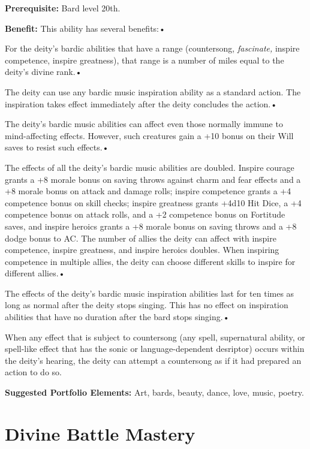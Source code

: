 \documentclass{article}
\begin{document}
\textbf{Prerequisite:} Bard level 20th.

\textbf{Benefit:} This ability has several benefits:• 

\parindent=3pt
For the deity's bardic abilities that have a range (countersong, \textit{fascinate, 
}inspire competence, inspire greatness), that range is a number of miles equal 
to the deity's divine rank.• 

The deity can use any bardic music inspiration ability as a standard action. The 
inspiration takes effect immediately after the deity concludes the action.• 

\parindent=7pt
The deity's bardic music abilities can affect even those normally immune to mind-affecting 
effects. However, such creatures gain a +10 bonus on their Will saves to resist 
such effects.• 

\parindent=3pt
The effects of all the deity's bardic music abilities are doubled. Inspire courage 
grants a +8 morale bonus on saving throws against charm and fear effects and a 
+8 morale bonus on attack and damage rolls; inspire competence grants a +4 competence 
bonus on skill checks; inspire greatness grants +4d10 Hit Dice, a +4 competence 
bonus on attack rolls, and a +2 competence bonus on Fortitude saves, and inspire 
heroics grants a +8 morale bonus on saving throws and a +8 dodge bonus to AC. The 
number of allies the deity can affect with inspire competence, inspire greatness, 
and inspire heroics doubles. When inspiring competence in multiple allies, the 
deity can choose different skills to inspire for different allies.• 

The effects of the deity's bardic music inspiration abilities last for ten times 
as long as normal after the deity stops singing. This has no effect on inspiration 
abilities that have no duration after the bard stops singing.• 

\parindent=7pt
When any effect that is subject to countersong (any spell, supernatural ability, 
or spell-like effect that has the sonic or language-dependent desriptor) occurs 
within the deity's hearing, the deity can attempt a countersong as if it had prepared 
an action to do so.

\parindent=0pt
\textbf{Suggested Portfolio Elements:} Art, bards, beauty, dance, love, music, 
poetry.

\vspace{12pt}
\section*{Divine Battle Mastery}
\end{document}
